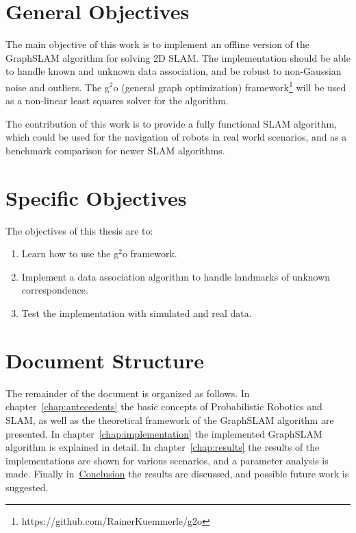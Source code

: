 \section{General Objectives}

The main objective of this work is to implement an offline version of the GraphSLAM algorithm for solving 2D SLAM. The implementation should be able to handle known and unknown data association, and be robust to non-Gaussian noise and outliers. The g$^2$o (general graph optimization) framework\footnote{https://github.com/RainerKuemmerle/g2o} will be used as a non-linear least squares solver for the algorithm.

The contribution of this work is to provide a fully functional SLAM algorithm, which could be used for the navigation of robots in real world scenarios, and as a benchmark comparison for newer SLAM algorithms.

\section{Specific Objectives}

The objectives of this thesis are to:

\begin{enumerate}
    \item Learn how to use the g$^2$o framework.
    \item Implement a data association algorithm to handle landmarks of unknown correspondence.
    \item Test the implementation with simulated and real data. 
\end{enumerate}

\section{Document Structure}

The remainder of the document is organized as follows. In chapter~\ref{chap:antecedents} the basic concepts of Probabilistic Robotics and SLAM, as well as the theoretical framework of the GraphSLAM algorithm are presented. In chapter~\ref{chap:implementation} the implemented GraphSLAM algorithm is explained in detail. In chapter~\ref{chap:results} the results of the implementations are shown for various scenarios, and a parameter analysis is made. Finally in~\hyperref[chap:conclusion]{Conclusion} the results are discussed, and possible future work is suggested. 

